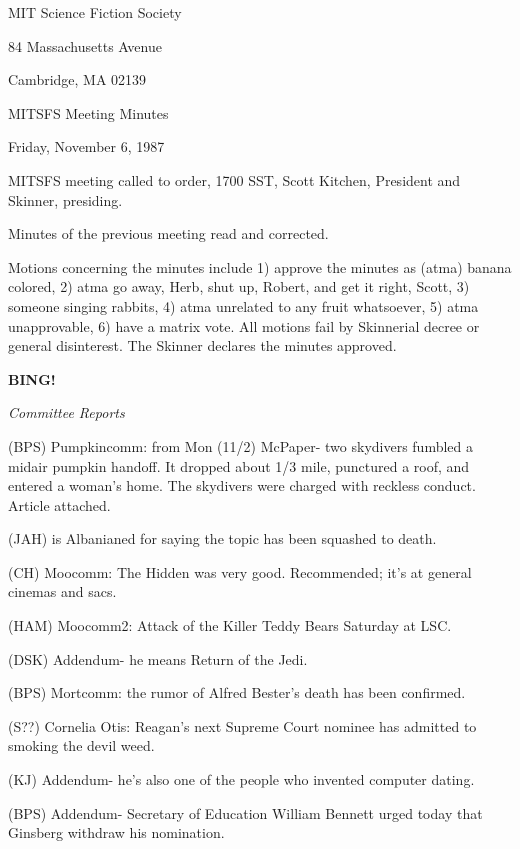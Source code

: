 \documentclass[12pt]{article}
\newcommand{\bing}{{\bf BING!} }
\newcommand{\goto}[1]{\bing \vskip 12pt \centerline{{\em{#1}}}}
\begin{document}
\begin{center}

MIT Science Fiction Society 

84 Massachusetts Avenue

Cambridge, MA 02139

\vspace{12pt}

MITSFS Meeting Minutes 

Friday, November 6, 1987

\end{center}
 
\vspace{18pt}

\setlength{\parskip}{6pt}

\noindent
MITSFS meeting called to order, 1700 SST,
Scott Kitchen, President and Skinner, presiding.

Minutes of the previous meeting read and corrected.

Motions concerning the minutes include 1) approve the minutes as (atma) banana colored, 2) atma go away, Herb, shut up, Robert, and get it right, Scott, 3) someone singing rabbits, 4) atma unrelated to any fruit whatsoever, 5) atma unapprovable, 6) have a matrix vote. All motions fail by Skinnerial decree or general disinterest. The Skinner declares the minutes approved.

\goto{Committee Reports}

(BPS) Pumpkincomm: from Mon (11/2) McPaper- two skydivers fumbled a midair pumpkin handoff. It dropped about 1/3 mile, punctured a roof, and entered a woman's home. The skydivers were charged with reckless conduct. Article attached.

(JAH) is Albanianed for saying the topic has been squashed to death.

(CH) Moocomm: The Hidden was very good. Recommended; it's at general cinemas and sacs.

(HAM) Moocomm2: Attack of the Killer Teddy Bears Saturday at LSC.

(DSK) Addendum- he means Return of the Jedi.

(BPS) Mortcomm: the rumor of Alfred Bester's death has been confirmed.

(S??) Cornelia Otis: Reagan's next Supreme Court nominee has admitted to smoking the devil weed.

(KJ) Addendum- he's also one of the people who invented computer dating.

(BPS) Addendum- Secretary of Education William Bennett urged today that Ginsberg withdraw his nomination.
\end{document}
